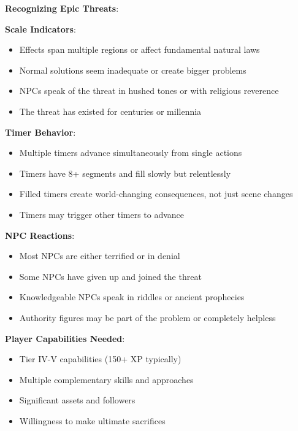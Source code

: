 \documentclass[11pt]{article}
\begin{document}
\begin{mdframed}[backgroundcolor=mechanicbg]
\textbf{Recognizing Epic Threats}:

\textbf{Scale Indicators}:
\begin{itemize}[leftmargin=*]
\item Effects span multiple regions or affect fundamental natural laws
\item Normal solutions seem inadequate or create bigger problems
\item NPCs speak of the threat in hushed tones or with religious reverence
\item The threat has existed for centuries or millennia
\end{itemize}

\textbf{Timer Behavior}:
\begin{itemize}[leftmargin=*]
\item Multiple timers advance simultaneously from single actions
\item Timers have 8+ segments and fill slowly but relentlessly
\item Filled timers create world-changing consequences, not just scene changes
\item Timers may trigger other timers to advance
\end{itemize}

\textbf{NPC Reactions}:
\begin{itemize}[leftmargin=*]
\item Most NPCs are either terrified or in denial
\item Some NPCs have given up and joined the threat
\item Knowledgeable NPCs speak in riddles or ancient prophecies
\item Authority figures may be part of the problem or completely helpless
\end{itemize}

\textbf{Player Capabilities Needed}:
\begin{itemize}[leftmargin=*]
\item Tier IV-V capabilities (150+ XP typically)
\item Multiple complementary skills and approaches
\item Significant assets and followers
\item Willingness to make ultimate sacrifices
\end{itemize}
\end{mdframed}
\end{document}
